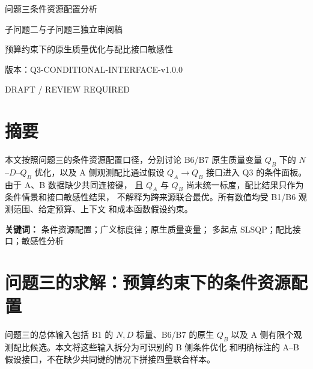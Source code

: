 \documentclass[UTF8,a4paper,12pt]{ctexart}
\begin{document}
\begin{titlepage}
  \centering
  \vspace*{2.0cm}
  {\heiti{}问题三条件资源配置分析\par}
  \vspace{0.8cm}
  {\heiti{}子问题二与子问题三独立审阅稿\par}
  \vfill
  {预算约束下的原生质量优化与配比接口敏感性\par}
  \vspace{1.0cm}
  {版本：Q3-CONDITIONAL-INTERFACE-v1.0.0\par}
  \vspace{2.0cm}
  {DRAFT / REVIEW REQUIRED\par}
\end{titlepage}

\section*{摘要}
本文按照问题三的条件资源配置口径，分别讨论 B6/B7 原生质量变量
$Q_B$ 下的 $N$--$D$--$Q_B$ 优化，以及 A 侧观测配比通过假设
$Q_A\to Q_B$ 接口进入 Q3 的条件面板。由于 A、B 数据缺少共同连接键，
且 $Q_A$ 与 $Q_B$ 尚未统一标度，配比结果只作为条件情景和接口敏感性结果，
不解释为跨来源联合最优。所有数值均受 B1/B6 观测范围、给定预算、上下文
和成本函数假设约束。

\noindent\textbf{关键词：} 条件资源配置；广义标度律；原生质量变量；
多起点 SLSQP；配比接口；敏感性分析

\clearpage
\tableofcontents
\clearpage
{}

\setcounter{section}{5}
\section{问题三的求解：预算约束下的条件资源配置}
\label{sec:q3-standalone}
问题三的总体输入包括 B1 的 $N,D$ 标量、B6/B7 的原生 $Q_B$ 以及
A 侧有限个观测配比候选。本文将这些输入拆分为可识别的 B 侧条件优化
和明确标注的 A--B 假设接口，不在缺少共同键的情况下拼接四量联合样本。

\setcounter{subsection}{4}


\setcounter{subsection}{5}

\end{document}
